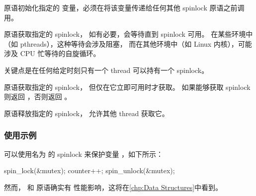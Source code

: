 \begin{description}[style=nextline]

\item[\tco{spin_lock_init()}]
 原语初始化指定的
 变量，必须在将该变量传递给任何其他
spinlock 原语之前调用。

\item[\tco{spin_lock()}]
 原语获取指定的 spinlock，
如有必要，会等待直到 spinlock 可用。
在某些环境中（如 pthreads），这种等待会涉及阻塞，
而在其他环境中（如 Linux 内核），可能涉及 CPU 忙等待的自旋循环。

关键点是在任何给定时刻只有一个 thread 可以持有一个 spinlock。

\item[\tco{spin_trylock()}]
 原语获取指定的 spinlock，
但仅在它立即可用时才获取。
如果能够获取 spinlock 则返回 ，否则返回 。

\item[\tco{spin_unlock()}]
 原语释放指定的 spinlock，
允许其他 thread 获取它。

\end{description}


\subsubsection{使用示例}

可以使用名为  的 spinlock 来保护变量
，如下所示：

\begin{VerbatimU}
spin_lock(&mutex);
counter++;
spin_unlock(&mutex);
\end{VerbatimU}

\QuickQuizEnd

然而， 和  原语确实有
性能影响，这将在\cref{chp:Data Structures}中看到。

